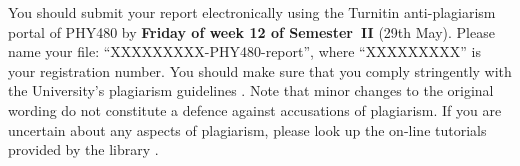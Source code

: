 \documentclass[aps,pra,twocolumn]{revtex4-2}
\begin{document}

You should submit your report electronically using the Turnitin anti-plagiarism portal of PHY480 by \textbf{Friday of week 12 of Semester~II} (29th May). Please name your file: ``XXXXXXXXX-PHY480-report'', where ``XXXXXXXXX'' is your registration number. You should make sure that you comply stringently with the University's plagiarism guidelines \cite{plagiarism}. Note that minor changes to the original wording do not constitute a defence against accusations of plagiarism. If you are uncertain about any aspects of  plagiarism, please look up the on-line tutorials provided by the library \cite{Referencing}. 

%
%
%
%
\end{document}
